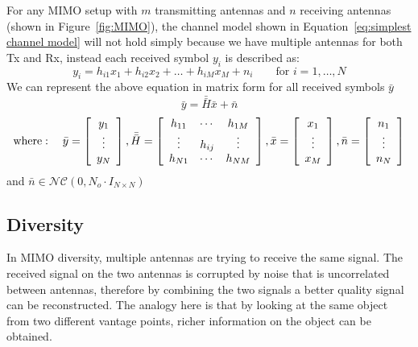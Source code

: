For any MIMO setup with $m$ transmitting antennas and $n$ receiving antennas (shown in Figure~\ref{fig:MIMO}), the channel model shown in Equation~\ref{eq:simplest channel model} will not hold simply because we have multiple antennas for both Tx and Rx, instead each received symbol $y_i$ is described as:
\begin{equation}
    \label{eq:y_i MIMO}
    y_i = h_{i1} x_1 + h_{i2} x_2 + \ldots + h_{iM} x_M + n_i \qquad \text{for } i=1,\ldots,N
\end{equation}
We can represent the above equation in matrix form for all received symbols $\bar{y}$
\begin{equation}
    \label{eq:y_bar MIMO}
    \bar{y} = \bar{\bar{H}} \bar{x} + \bar{n}
\end{equation}
\[ \text{where}: \quad \bar{y} = \left[ \begin{array}{c}
    y_1 \\
    \vdots \\
    y_N
\end{array} \right] , \bar{\bar{H}} = \left[ \begin{array}{c c c}
    h_{11} & \cdots & h_{1M} \\
    \vdots & h_{ij} & \vdots \\
    h_{N1} & \cdots & h_{NM}
\end{array} \right] , \bar{x} = \left[ \begin{array}{c}
    x_1 \\
    \vdots \\
    x_M
\end{array} \right] , \bar{n} = \left[ \begin{array}{c}
    n_1 \\
    \vdots \\
    n_N     
\end{array} \right] \]
and $\bar{n} \in \mathcal{N} \mathcal{C}\left( 0, N_o \cdot I_{N \times N} \right)$

\subsection{Diversity}
\label{subsection:MIMO-Diversity}
In MIMO diversity, multiple antennas are trying to receive the same signal. The received signal on the two antennas is corrupted by noise that is uncorrelated between antennas, therefore by combining the two signals a better quality signal can be reconstructed. The analogy here is that by looking at the same object from two different vantage points, richer information on the object can be obtained.


